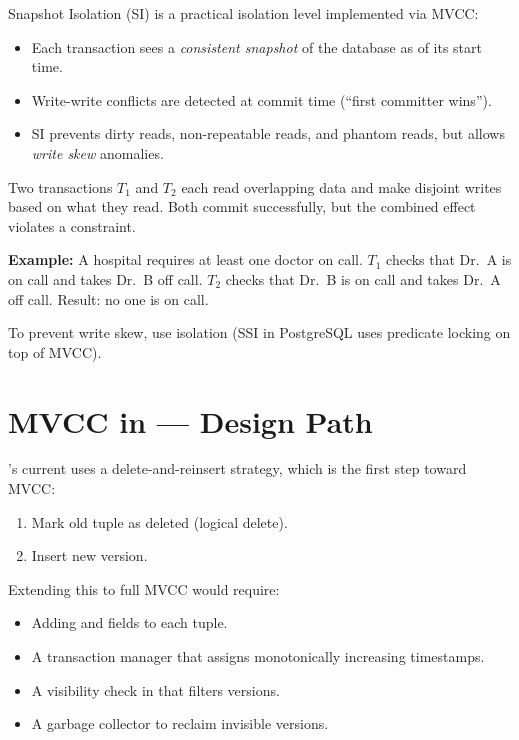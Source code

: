 Snapshot Isolation (SI) is a practical isolation level implemented via MVCC:
\begin{itemize}[nosep]
  \item Each transaction sees a \emph{consistent snapshot} of the database as of its start time.
  \item Write-write conflicts are detected at commit time (``first committer wins'').
  \item SI prevents dirty reads, non-repeatable reads, and phantom reads, but allows \emph{write skew} anomalies.
\end{itemize}

\begin{deepdivebox}
Two transactions $T_1$ and $T_2$ each read overlapping data and make disjoint writes based on what they read.  Both commit successfully, but the combined effect violates a constraint.

\textbf{Example:} A hospital requires at least one doctor on call.  $T_1$ checks that Dr.\ A is on call and takes Dr.\ B off call.  $T_2$ checks that Dr.\ B is on call and takes Dr.\ A off call.  Result: no one is on call.

To prevent write skew, use  isolation (SSI in PostgreSQL uses predicate locking on top of MVCC).
\end{deepdivebox}

\section{MVCC in \shiftdb{} --- Design Path}

\shiftdb{}'s current  uses a delete-and-reinsert strategy, which is the first step toward MVCC:
\begin{enumerate}[nosep]
  \item Mark old tuple as deleted (logical delete).
  \item Insert new version.
\end{enumerate}
Extending this to full MVCC would require:
\begin{itemize}[nosep]
  \item Adding  and  fields to each tuple.
  \item A transaction manager that assigns monotonically increasing timestamps.
  \item A visibility check in  that filters versions.
  \item A garbage collector to reclaim invisible versions.
\end{itemize}

